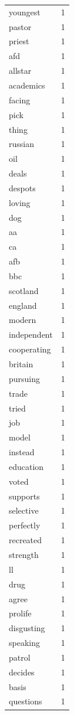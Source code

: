 \begin{tabular}{lr}
youngest & 1 \\
pastor & 1 \\
priest & 1 \\
afd & 1 \\
allstar & 1 \\
academics & 1 \\
facing & 1 \\
pick & 1 \\
thing & 1 \\
russian & 1 \\
oil & 1 \\
deals & 1 \\
despots & 1 \\
loving & 1 \\
dog & 1 \\
aa & 1 \\
ca & 1 \\
afb & 1 \\
bbc & 1 \\
scotland & 1 \\
england & 1 \\
modern & 1 \\
independent & 1 \\
cooperating & 1 \\
britain & 1 \\
pursuing & 1 \\
trade & 1 \\
tried & 1 \\
job & 1 \\
model & 1 \\
instead & 1 \\
education & 1 \\
voted & 1 \\
supports & 1 \\
selective & 1 \\
perfectly & 1 \\
recreated & 1 \\
strength & 1 \\
ll & 1 \\
drug & 1 \\
agree & 1 \\
prolife & 1 \\
disgusting & 1 \\
speaking & 1 \\
patrol & 1 \\
decides & 1 \\
basis & 1 \\
questions & 1 \\

\end{tabular}

